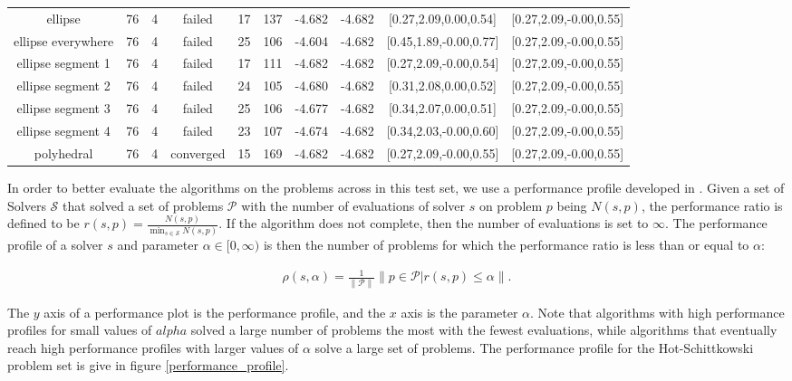 \begin{tiny}
\begin{center}
\begin{longtable}{ c c c c c c c c c c }
         ellipse          &   76  &  4  &   failed   &   17  &  137  &   -4.682   &   -4.682   & [0.27,2.09,0.00,0.54] & [0.27,2.09,-0.00,0.55] \\
    ellipse everywhere    &   76  &  4  &   failed   &   25  &  106  &   -4.604   &   -4.682   & [0.45,1.89,-0.00,0.77] & [0.27,2.09,-0.00,0.55] \\
    ellipse segment 1     &   76  &  4  &   failed   &   17  &  111  &   -4.682   &   -4.682   & [0.27,2.09,-0.00,0.54] & [0.27,2.09,-0.00,0.55] \\
    ellipse segment 2     &   76  &  4  &   failed   &   24  &  105  &   -4.680   &   -4.682   & [0.31,2.08,0.00,0.52] & [0.27,2.09,-0.00,0.55] \\
    ellipse segment 3     &   76  &  4  &   failed   &   25  &  106  &   -4.677   &   -4.682   & [0.34,2.07,0.00,0.51] & [0.27,2.09,-0.00,0.55] \\
    ellipse segment 4     &   76  &  4  &   failed   &   23  &  107  &   -4.674   &   -4.682   & [0.34,2.03,-0.00,0.60] & [0.27,2.09,-0.00,0.55] \\
        polyhedral        &   76  &  4  & converged  &   15  &  169  &   -4.682   &   -4.682   & [0.27,2.09,-0.00,0.55] & [0.27,2.09,-0.00,0.55]
\end{longtable}
\end{center}


\end{tiny}

In order to better evaluate the algorithms on the problems across in this test set, we use a performance profile developed in \cite{More:2009:BDO:1654367.1654371}.
Given a set of Solvers $\mathcal S$ that solved a set of problems $\mathcal P$ with the number of evaluations of solver $s$ on problem $p$ being $N(s, p)$, the performance ratio is defined to be $r(s, p) = \frac{N(s, p)}{\min_{s \in \mathcal S} N(s, p)}$.
If the algorithm does not complete, then the number of evaluations is set to $\infty$.
The performance profile of a solver $s$ and parameter $\alpha \in [0, \infty)$ is then the number of problems for which the performance ratio is less than or equal to $\alpha$: 

\begin{align}
\rho(s, \alpha) = \frac 1 {\|\mathcal P \|} \|p \in \mathcal P | r(s, p) \le \alpha\|.
\end{align}

The $y$ axis of a performance plot is the performance profile, and the $x$ axis is the parameter $\alpha$.
Note that algorithms with high performance profiles for small values of $alpha$ solved a large number of problems the most with the fewest evaluations, while algorithms that eventually reach high performance profiles with larger values of $\alpha$ solve a large set of problems.
The performance profile for the Hot-Schittkowski problem set is give in figure \cref{performance_profile}.


